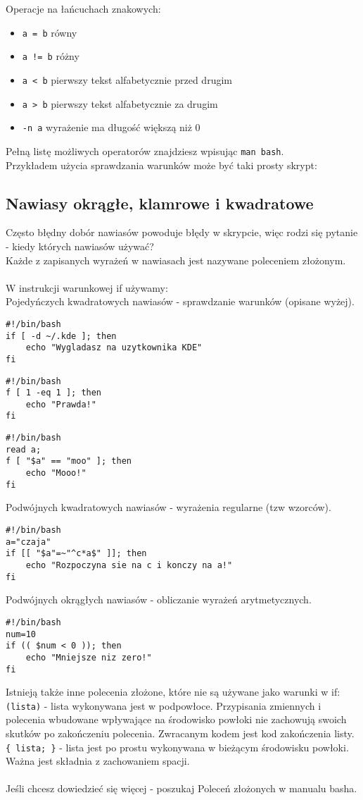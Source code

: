 \documentclass[10 pt, a4paper]{article}
\begin{document}
Operacje na łańcuchach znakowych:
\begin{itemize}[itemsep=0cm,leftmargin=1cm]
\item \texttt{a = b} równy
\item \texttt{a != b} różny
\item \texttt{a < b} pierwszy tekst alfabetycznie przed drugim
\item \texttt{a > b} pierwszy tekst alfabetycznie za drugim
\item \texttt{-n a} wyrażenie ma długość większą niż 0
\end{itemize}
Pełną listę możliwych operatorów znajdziesz wpisując \texttt{man bash}.\\
Przykładem użycia sprawdzania warunków może być taki prosty skrypt:


\subsection{Nawiasy okrągłe, klamrowe i kwadratowe}
Często błędny dobór nawiasów powoduje błędy w skrypcie, więc rodzi się pytanie - kiedy których nawiasów używać?\\
Każde z zapisanych wyrażeń w nawiasach jest nazywane poleceniem złożonym.\\\\
W instrukcji warunkowej if używamy:\\
Pojedyńczych kwadratowych nawiasów - sprawdzanie warunków (opisane wyżej).
\begin{lstlisting}
#!/bin/bash
if [ -d ~/.kde ]; then
    echo "Wygladasz na uzytkownika KDE"
fi
\end{lstlisting}
\begin{lstlisting}
#!/bin/bash
f [ 1 -eq 1 ]; then
    echo "Prawda!" 
fi
\end{lstlisting}
\begin{lstlisting}
#!/bin/bash
read a;
f [ "$a" == "moo" ]; then
    echo "Mooo!" 
fi
\end{lstlisting}
Podwójnych kwadratowych nawiasów - wyrażenia regularne (tzw wzorców).
\begin{lstlisting}
#!/bin/bash
a="czaja"
if [[ "$a"=~"^c*a$" ]]; then
    echo "Rozpoczyna sie na c i konczy na a!"
fi
\end{lstlisting}
Podwójnych okrągłych nawiasów - obliczanie wyrażeń arytmetycznych.
\begin{lstlisting}
#!/bin/bash
num=10
if (( $num < 0 )); then
    echo "Mniejsze niz zero!"
fi 
\end{lstlisting}
Istnieją także inne polecenia złożone, które nie są używane jako warunki w if:\\
\texttt{(lista)} - lista wykonywana jest w podpowłoce. Przypisania zmiennych i  polecenia  wbudowane  wpływające na środowisko powłoki nie zachowują swoich skutków  po  zakończeniu  polecenia. Zwracanym kodem jest kod zakończenia listy.\\
\texttt{\{ lista; \}} - lista jest po prostu wykonywana w bieżącym środowisku powłoki. Ważna jest składnia z zachowaniem spacji.\\\\
Jeśli chcesz dowiedzieć się więcej - poszukaj Poleceń złożonych w manualu basha.
\end{document}
